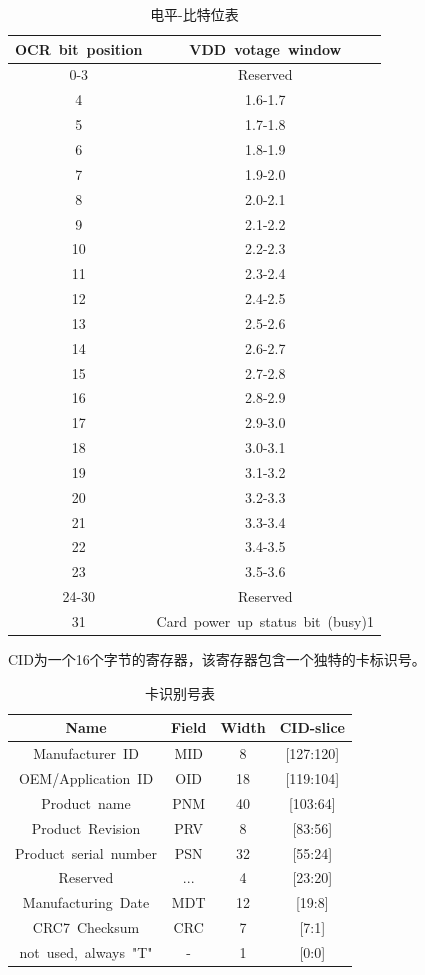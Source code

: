 \begin{table}[h]
    \centering
\begin{tabular}{|c|c|}
    \hline
OCR~bit~position&VDD~votage~window\\
\hline
0-3	&Reserved\\
\hline
4	&1.6-1.7\\
\hline
5	&1.7-1.8\\
\hline
6	&1.8-1.9\\
\hline
7	&1.9-2.0\\
\hline
8	&2.0-2.1\\
\hline
9	&2.1-2.2\\
\hline
10	&2.2-2.3\\
\hline
11	&2.3-2.4\\
\hline
12	&2.4-2.5\\
\hline
13	&2.5-2.6\\
\hline
14	&2.6-2.7\\
\hline
15	&2.7-2.8\\
\hline
16	&2.8-2.9\\
\hline
17	&2.9-3.0\\
\hline
18	&3.0-3.1\\
\hline
19	&3.1-3.2\\
\hline
20	&3.2-3.3\\
\hline
21	&3.3-3.4\\
\hline
22	&3.4-3.5\\
\hline
23	&3.5-3.6\\
\hline
24-30	&Reserved\\
\hline
31	&Card~power~up~status~bit~(busy)1\\
\hline
\end{tabular}
\caption{电平-比特位表}
\end{table}

CID为一个16个字节的寄存器，该寄存器包含一个独特的卡标识号。

\begin{table}[!ht]
    \centering
\begin{tabular}{|c|c|c|c|}
    \hline
    Name	            &Field	&Width	&CID-slice\\
    \hline
    Manufacturer~ID	    &MID     &8	    &[127:120]\\
    \hline
    OEM/Application~ID	&OID     &18	    &[119:104]\\
    \hline
    Product~name	    &PNM	    &40	    &[103:64]\\
    \hline
    Product~Revision	&PRV     &8	    &[83:56]\\
    \hline
    Product~serial~number	&PSN &32	    &[55:24]\\
    \hline
    Reserved	        &...	    &4	    &[23:20]\\
    \hline
    Manufacturing~Date	&MDT     &12	    &[19:8]\\
    \hline
    CRC7~Checksum	    &CRC	    &7	    &[7:1]\\
    \hline
    not~used,~always~"T"&-	    &1	    &[0:0]\\
    \hline
\end{tabular}
\caption{卡识别号表}
\end{table}

